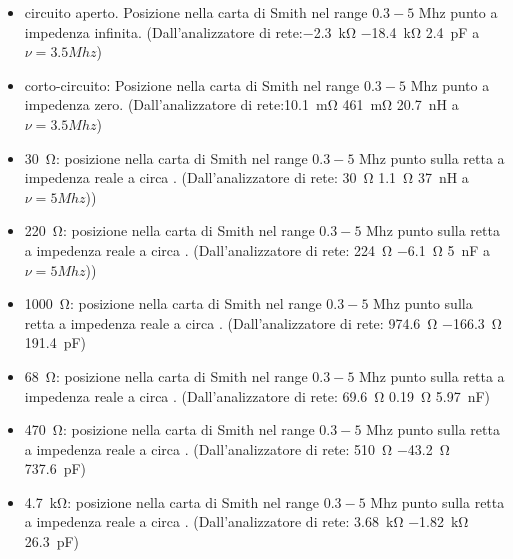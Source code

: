 \documentclass[main.tex]{subfiles}
\begin{document}
\begin{itemize}
\item circuito aperto.
Posizione nella carta di Smith nel range $0.3-5$ Mhz punto a impedenza infinita. (Dall'analizzatore di rete:\SI{-2.3}{\kilo\ohm} \SI{-18.4}{\kilo\ohm} \SI{2.4}{\pico\farad} a $\nu=3.5Mhz$)
\item corto-circuito: Posizione nella carta di Smith nel range $0.3-5$ Mhz punto a impedenza zero. (Dall'analizzatore di rete:\SI{10.1}{\milli\ohm} \SI{461}{\milli\ohm} \SI{20.7}{\nano\henry} a $\nu=3.5Mhz$)
\item \SI{30}{\ohm}: posizione nella carta di Smith nel range $0.3-5$ Mhz punto sulla retta a impedenza reale a circa \pgfmathprintnumber{\pgfmathresult}. (Dall'analizzatore di rete: \SI{30}{\ohm} \SI{1.1}{\ohm} \SI{37}{\nano\henry} a $\nu=5Mhz$))
\item \SI{220}{\ohm}: posizione nella carta di Smith nel range $0.3-5$ Mhz punto sulla retta a impedenza reale a circa \pgfmathprintnumber{\pgfmathresult}. (Dall'analizzatore di rete: \SI{224}{\ohm}  \SI{-6.1}{\ohm} \SI{5}{\nano\farad} a $\nu=5Mhz$))
\item \SI{1000}{\ohm}: posizione nella carta di Smith nel range $0.3-5$ Mhz punto sulla retta a impedenza reale a circa \pgfmathprintnumber{\pgfmathresult}. (Dall'analizzatore di rete: \SI{974.6}{\ohm} \SI{-166.3}{\ohm}  \SI{191.4}{\pico\farad})
\item \SI{68}{\ohm}: posizione nella carta di Smith nel range $0.3-5$ Mhz punto sulla retta a impedenza reale a circa \pgfmathprintnumber{\pgfmathresult}. (Dall'analizzatore di rete: \SI{69.6}{\ohm} \SI{0.19}{\ohm}  \SI{5.97}{\nano\farad})
\item \SI{470}{\ohm}: posizione nella carta di Smith nel range $0.3-5$ Mhz punto sulla retta a impedenza reale a circa \pgfmathprintnumber{\pgfmathresult}. (Dall'analizzatore di rete: \SI{510}{\ohm} \SI{-43.2}{\ohm} \SI{737.6}{\pico\farad})
 \item \SI{4.7}{\kilo\ohm}: posizione nella carta di Smith nel range $0.3-5$ Mhz punto sulla retta a impedenza reale a circa \pgfmathprintnumber{\pgfmathresult}. (Dall'analizzatore di rete: \SI{3.68}{\kilo\ohm} \SI{-1.82}{\kilo\ohm} \SI{26.3}{\pico\farad})
 

\end{itemize}
\end{document}
